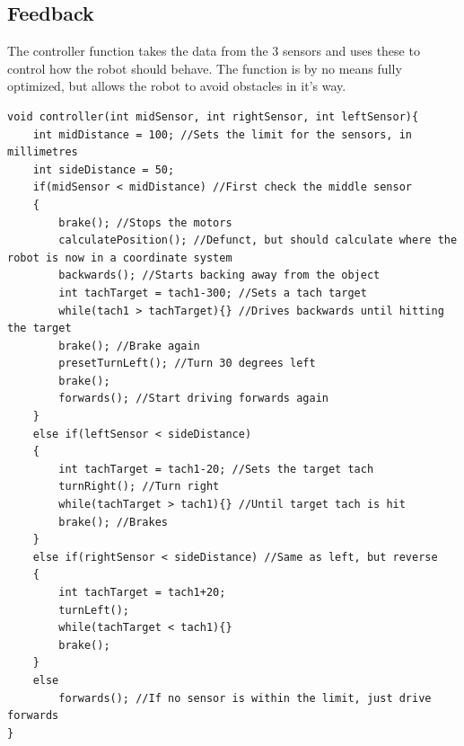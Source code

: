 \subsection{Feedback}
The controller function takes the data from the 3 sensors and uses these to control how the robot should behave. The function is by no means fully optimized, but allows the robot to avoid obstacles in it's way.
\begin{lstlisting}
void controller(int midSensor, int rightSensor, int leftSensor){
    int midDistance = 100; //Sets the limit for the sensors, in millimetres
    int sideDistance = 50;
    if(midSensor < midDistance) //First check the middle sensor
    {
        brake(); //Stops the motors
        calculatePosition(); //Defunct, but should calculate where the robot is now in a coordinate system
        backwards(); //Starts backing away from the object
        int tachTarget = tach1-300; //Sets a tach target
        while(tach1 > tachTarget){} //Drives backwards until hitting the target
        brake(); //Brake again
        presetTurnLeft(); //Turn 30 degrees left
        brake();
        forwards(); //Start driving forwards again
    }
    else if(leftSensor < sideDistance)
    {
        int tachTarget = tach1-20; //Sets the target tach
        turnRight(); //Turn right
        while(tachTarget > tach1){} //Until target tach is hit
        brake(); //Brakes
    }
    else if(rightSensor < sideDistance) //Same as left, but reverse
    {
        int tachTarget = tach1+20;
        turnLeft();
        while(tachTarget < tach1){}
        brake();
    }
    else
        forwards(); //If no sensor is within the limit, just drive forwards
}
\end{lstlisting}
\newpage
